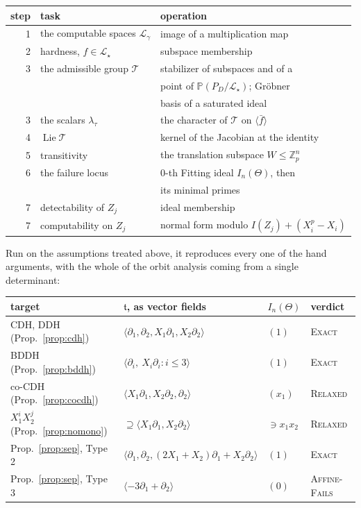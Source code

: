 \documentclass{aicr-solution}
\newcommand{\Zp}{\mathbb{Z}_p}
\newcommand{\LL}{\mathcal{L}}
\newcommand{\Span}[1]{\langle #1 \rangle} %
\newcommand{\Lie}{\operatorname{Lie}}
\newcommand{\tge}{\mathfrak{t}}
\newcommand{\PP}{\mathbb{P}}
\begin{document}
\begin{center}
\small
\begin{tabular}{@{}rll@{}}
\toprule
step & task & operation \\
\midrule
1 & the computable spaces $\LL_\gamma$ & image of a multiplication map \\
2 & hardness, $f\in\LL_\star$ & subspace membership \\
3 & the admissible group $\mathcal T$ & stabilizer of subspaces and of a \\
  & & point of $\PP(P_D/\LL_\star)$; Gr\"obner \\
  & & basis of a saturated ideal \\
3 & the scalars $\lambda_\tau$ & the character of $\mathcal T$ on $\Span{\bar f}$ \\
4 & $\Lie\mathcal T$ & kernel of the Jacobian at the identity \\
5 & transitivity & the translation subspace $W\le\Zp^{n}$ \\
6 & the failure locus & $0$-th Fitting ideal $I_n(\Theta)$, then \\
  & & its minimal primes \\
7 & detectability of $Z_j$ & ideal membership \\
7 & computability on $Z_j$ & normal form modulo
                             $I(Z_j)+(X_i^{p}-X_i)$ \\
\bottomrule
\end{tabular}
\end{center}

\noindent
Run on the assumptions treated above, it reproduces every one of the hand arguments, with the
whole of the orbit analysis coming from a single determinant:

\begin{center}
\footnotesize
\setlength{\tabcolsep}{4.5pt}
\begin{tabular}{@{}llll@{}}
\toprule
target & $\tge$, as vector fields & $I_n(\Theta)$ & verdict \\
\midrule
CDH, DDH (Prop.~\ref{prop:cdh})
  & $\Span{\partial_1,\partial_2,X_1\partial_1,X_2\partial_2}$
  & $(1)$ & \textsc{Exact} \\
BDDH (Prop.~\ref{prop:bddh})
  & $\Span{\partial_i,\ X_i\partial_i:i\le 3}$
  & $(1)$ & \textsc{Exact} \\
co-CDH (Prop.~\ref{prop:cocdh})
  & $\Span{X_1\partial_1,X_2\partial_2,\partial_2}$
  & $(x_1)$ & \textsc{Relaxed} \\
$X_1^{i}X_2^{j}$ (Prop.~\ref{prop:nomono})
  & $\supseteq\Span{X_1\partial_1,X_2\partial_2}$
  & $\ni x_1x_2$ & \textsc{Relaxed} \\
Prop.~\ref{prop:sep}, Type 2
  & $\Span{\partial_1,\partial_2,(2X_1{+}X_2)\partial_1+X_2\partial_2}$
  & $(1)$ & \textsc{Exact} \\
Prop.~\ref{prop:sep}, Type 3
  & $\Span{-3\partial_1+\partial_2}$
  & $(0)$ & \textsc{Affine-Fails} \\
\bottomrule
\end{tabular}
\end{center}
\end{document}
